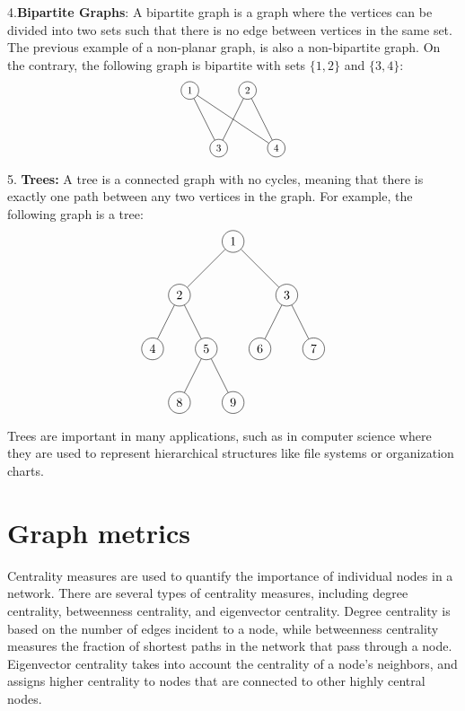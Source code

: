 4.{\bf Bipartite Graphs}: A bipartite graph is a graph where the vertices can be divided into two sets such that there is no edge between vertices in the same set. The previous example of a non-planar graph, is also a non-bipartite graph. On the contrary, the following graph is bipartite with sets $\{1,2\}$ and $\{3,4\}$:
\[
 \begin{tikzpicture}[scale=0.8, transform shape]
\node[shape=circle,draw=black] (1) at (0,2) {1};
\node[shape=circle,draw=black] (2) at (2,2) {2};
\node[shape=circle,draw=black] (3) at (1,0) {3};
\node[shape=circle,draw=black] (4) at (3,0) {4};
\draw[-] (1) -- (3);
\draw[-] (1) -- (4);
\draw[-] (2) -- (3);
\draw[-] (2) -- (4);
\end{tikzpicture}
\]

5. {\bf Trees:} A tree is a connected graph with no cycles, meaning that there is exactly one path between any two vertices in the graph. For example, the following graph is a tree:
\[
\begin{tikzpicture}[level distance=1.5cm,
  level 1/.style={sibling distance=3cm},
  level 2/.style={sibling distance=1.5cm}]
  \node[circle,draw](1){$1$}
    child{node[circle,draw](2){$2$}
      child{node[circle,draw](4){$4$}}
      child{node[circle,draw](5){$5$}
        child{node[circle,draw](8){$8$}}
        child{node[circle,draw](9){$9$}}
      }
    }
    child{node[circle,draw](3){$3$}
      child{node[circle,draw](6){$6$}}
      child{node[circle,draw](7){$7$}}
    };
\end{tikzpicture}\]

Trees are important in many applications, such as in computer science where they are used to represent hierarchical structures like file systems or organization charts.

\section{Graph metrics}

Centrality measures are used to quantify the importance of individual nodes in a network. There are several types of centrality measures, including degree centrality, betweenness centrality, and eigenvector centrality. Degree centrality is based on the number of edges incident to a node, while betweenness centrality measures the fraction of shortest paths in the network that pass through a node. Eigenvector centrality takes into account the centrality of a node's neighbors, and assigns higher centrality to nodes that are connected to other highly central nodes.

